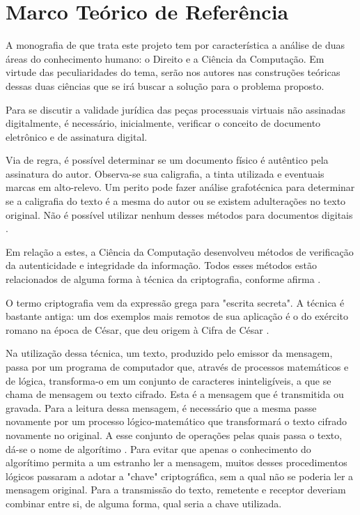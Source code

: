 \chapter{Marco Teórico de Referência}
  \label{marcoteorico}

  A monografia de que trata este projeto tem por característica a
  análise de duas áreas do conhecimento humano: o Direito e a
  Ciência da Computação. Em virtude das peculiaridades do tema,
  serão nos autores nas construções teóricas dessas duas ciências
  que se irá buscar a solução para o problema proposto.\par

  Para se discutir a validade jurídica das peças processuais
  virtuais não assinadas digitalmente, é necessário,
  inicialmente, verificar o conceito de documento eletrônico e de
  assinatura digital.\par

  Via de regra, é possível determinar se um documento físico é
  autêntico pela assinatura do autor. Observa-se sua caligrafia,
  a tinta utilizada e eventuais marcas em alto-relevo. Um perito
  pode fazer análise grafotécnica para determinar se a caligrafia
  do texto é a mesma do autor ou se existem adulterações no texto
  original. Não é possível utilizar nenhum desses métodos para
  documentos digitais \cite{ComputerNetworks, CertificadoDigital}.\par

  Em relação a estes, a Ciência da Computação desenvolveu métodos
  de verificação da autenticidade e integridade da informação.
  Todos esses métodos estão relacionados de alguma forma à
  técnica da criptografia, conforme afirma
  .\par

  O termo criptografia vem da expressão grega para "escrita
  secreta". A técnica é bastante antiga: um dos exemplos mais
  remotos de sua aplicação é o do exército romano na época de
  César, que deu origem à Cifra de César \cite[p.
  555]{ComputerNetworks}.\par

  Na utilização dessa técnica, um texto, produzido pelo emissor da
  mensagem, passa por um programa de computador que, através de
  processos matemáticos e de lógica, transforma-o em um conjunto de
  caracteres ininteligíveis, a que se chama de mensagem ou texto
  cifrado.  Esta é a mensagem que é transmitida ou gravada. Para
  a leitura dessa mensagem, é necessário que a mesma passe
  novamente por um processo lógico-matemático que transformará o
  texto cifrado novamente no original. A esse conjunto de
  operações pelas quais passa o texto, dá-se o nome de
  algorítimo \cite{ComputerNetworks}. Para evitar que apenas o
  conhecimento do algorítimo permita a um estranho ler a
  mensagem, muitos desses procedimentos lógicos passaram a adotar
  a "chave" criptográfica, sem a qual não se poderia ler a
  mensagem original. Para a transmissão do texto, remetente e
  receptor deveriam combinar entre si, de alguma forma, qual
  seria a chave utilizada.\par

